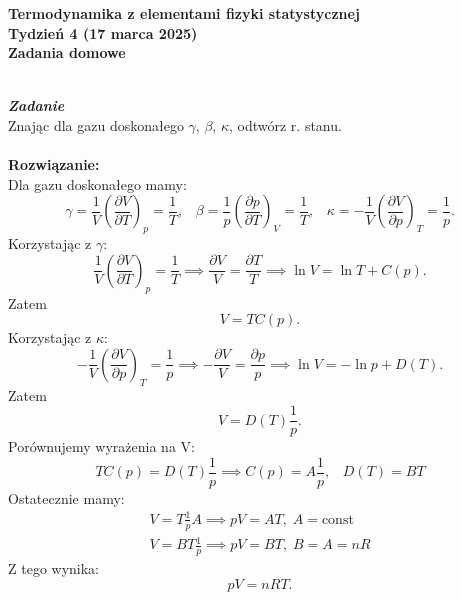 \documentclass[11pt,a4paper]{article}
\newcounter{zadanie}\newcommand{\zadanie}[1][]{\addtocounter{zadanie}{1} ~\\  {\bf \emph{Zadanie \arabic{zadanie} #1 }} \\}
\newcommand{\Partial}[3]{\left( \frac{\partial #1}{\partial #2} \right)_{#3}}
\begin{document}

\begin{centering}
\bf{\Large{Termodynamika z elementami fizyki statystycznej}}\\
Tydzień 4  (17 marca 2025)\\[3mm]
Zadania domowe \\ 
\end{centering} 
\vspace{5mm}
\zadanie
Znając dla gazu doskonałego $\gamma$, $\beta$, $\kappa$, odtwórz r. stanu.\\
\\
\textbf{Rozwiązanie:}
\\
Dla gazu doskonałego mamy:
\begin{equation*}
    \gamma = \frac{1}{V}\Partial{V}{T}{p} = \frac{1}{T},\;\;\; \beta = \frac{1}{p}\Partial{p}{T}{V} = \frac{1}{T},\;\;\; \kappa = -\frac{1}{V}\Partial{V}{p}{T} = \frac{1}{p}.
\end{equation*}
Korzystając z $\gamma:$
\begin{equation*}
    \frac{1}{V}\Partial{V}{T}{p} = \frac{1}{T} \implies \frac{\partial V}{V} = \frac{\partial T}{T} \implies \ln V = \ln T +C(p).
\end{equation*}
Zatem
\begin{equation*}
        V = T C(p).
\end{equation*}
Korzystając z $\kappa:$
\begin{equation*}
   -\frac{1}{V}\Partial{V}{p}{T} = \frac{1}{p} \implies -\frac{\partial V}{V} = \frac{\partial p}{p} \implies \ln V = -\ln p +D(T).
\end{equation*}
Zatem
\begin{equation*}
        V = D(T)\frac{1}{p}.
\end{equation*}
Porównujemy wyrażenia na V:
\begin{equation*}
    T C(p) = D(T)\frac{1}{p} \implies C(p) = A \frac{1}{p}, \;\;\; D(T) = BT
\end{equation*}
Ostatecznie mamy:
\begin{align*}
    V = T \frac{1}{p} A \implies pV = A T,\; A = \text{const}\\
    V = B T \frac{1}{p}  \implies pV = B T,\; B = A = nR
\end{align*}
Z tego wynika:
\begin{equation*}
    pV = nRT.
\end{equation*}
\newpage
\end{document}
